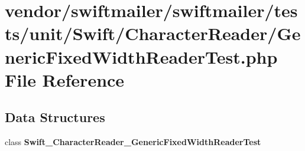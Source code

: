 \section{vendor/swiftmailer/swiftmailer/tests/unit/\+Swift/\+Character\+Reader/\+Generic\+Fixed\+Width\+Reader\+Test.php File Reference}
\label{_generic_fixed_width_reader_test_8php}
\subsection*{Data Structures}
\begin{DoxyCompactItemize}
\item 
class {\bf Swift\+\_\+\+Character\+Reader\+\_\+\+Generic\+Fixed\+Width\+Reader\+Test}
\end{DoxyCompactItemize}
